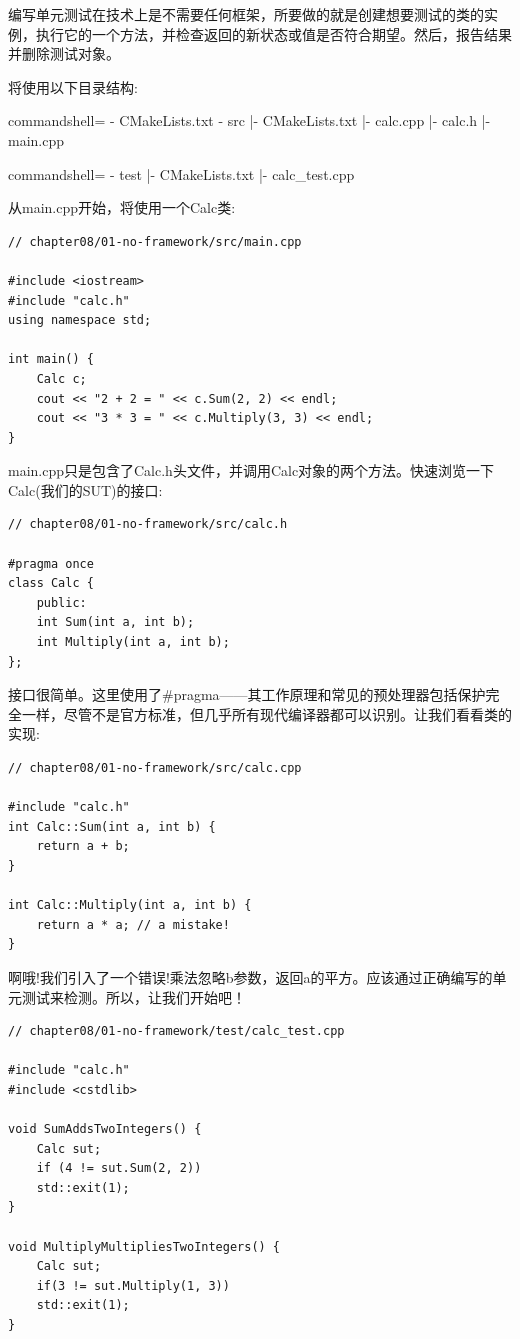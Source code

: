 
编写单元测试在技术上是不需要任何框架，所要做的就是创建想要测试的类的实例，执行它的一个方法，并检查返回的新状态或值是否符合期望。然后，报告结果并删除测试对象。

将使用以下目录结构:

\begin{tcblisting}{commandshell={}}
- CMakeLists.txt
- src
     |- CMakeLists.txt
     |- calc.cpp
     |- calc.h
     |- main.cpp
\end{tcblisting}

\begin{tcblisting}{commandshell={}}
- test
     |- CMakeLists.txt
     |- calc_test.cpp
\end{tcblisting}

从main.cpp开始，将使用一个Calc类:

\begin{lstlisting}[style=styleCXX]
// chapter08/01-no-framework/src/main.cpp

#include <iostream>
#include "calc.h"
using namespace std;

int main() {
	Calc c;
	cout << "2 + 2 = " << c.Sum(2, 2) << endl;
	cout << "3 * 3 = " << c.Multiply(3, 3) << endl;
}
\end{lstlisting} 

main.cpp只是包含了Calc.h头文件，并调用Calc对象的两个方法。快速浏览一下Calc(我们的SUT)的接口:

\begin{lstlisting}[style=styleCXX]
// chapter08/01-no-framework/src/calc.h

#pragma once
class Calc {
	public:
	int Sum(int a, int b);
	int Multiply(int a, int b);
};
\end{lstlisting} 

接口很简单。这里使用了\#pragma——其工作原理和常见的预处理器包括保护完全一样，尽管不是官方标准，但几乎所有现代编译器都可以识别。让我们看看类的实现:

\begin{lstlisting}[style=styleCXX]
// chapter08/01-no-framework/src/calc.cpp

#include "calc.h"
int Calc::Sum(int a, int b) {
	return a + b;
}

int Calc::Multiply(int a, int b) {
	return a * a; // a mistake!
}
\end{lstlisting} 

啊哦!我们引入了一个错误!乘法忽略b参数，返回a的平方。应该通过正确编写的单元测试来检测。所以，让我们开始吧！

\begin{lstlisting}[style=styleCXX]
// chapter08/01-no-framework/test/calc_test.cpp

#include "calc.h"
#include <cstdlib>

void SumAddsTwoIntegers() {
	Calc sut;
	if (4 != sut.Sum(2, 2))
	std::exit(1);
}

void MultiplyMultipliesTwoIntegers() {
	Calc sut;
	if(3 != sut.Multiply(1, 3))
	std::exit(1);
}
\end{lstlisting} 

